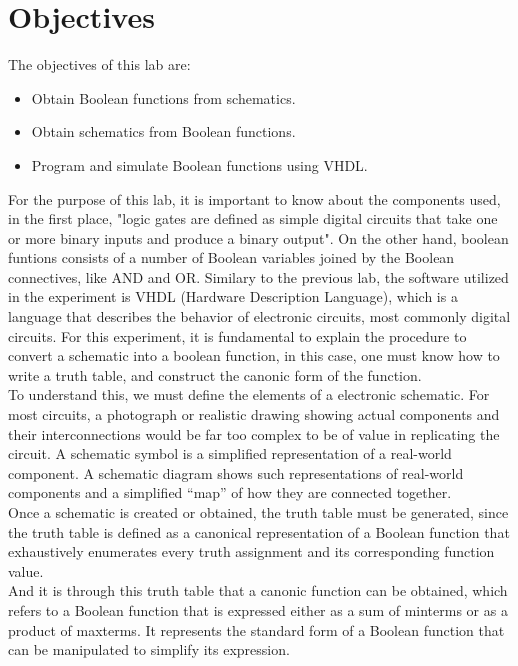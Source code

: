 \documentclass[12pt]{article}  %
\begin{document}
\section{Objectives} %
The objectives of this lab are:
\begin{itemize}
    \item Obtain Boolean functions from schematics.
    \item Obtain schematics from Boolean functions.
    \item Program and simulate Boolean functions using VHDL.
\end{itemize}
For the purpose of this lab, it is important to know about the components used, in the first place, "logic gates are defined as simple digital circuits that take one or more binary inputs and produce a binary output"\cite{HARRIS20221}.
On the other hand, boolean funtions consists of a number of Boolean variables joined by the Boolean connectives, like AND and OR. \cite{HOLDSWORTH200228}
Similary to the previous lab, the software utilized in the experiment is VHDL (Hardware Description Language), which is a language that describes the behavior of electronic circuits, most commonly digital circuits. \cite{IntelVHDLDef}
For this experiment, it is fundamental to explain the procedure to convert a schematic into a boolean function, in this case, one must know how to write a truth table, and construct the canonic form of the function.
\\To understand this, we must define the elements of a electronic schematic. For most circuits, a photograph or realistic drawing showing actual components and their interconnections would be far too complex to be of value in replicating the circuit. A schematic symbol is a simplified representation of a real-world component. A schematic diagram shows such representations of real-world components and a simplified “map” of how they are connected together.\cite{VARTERESIAN20021}
\\Once a schematic is created or obtained, the truth table must be generated, since the truth table is defined as a canonical representation of a Boolean function that exhaustively enumerates every truth assignment and its corresponding function value. \cite{JIANG2009299}
\\And it is through this truth table that a canonic function can be obtained, which refers to a Boolean function that is expressed either as a sum of minterms or as a product of maxterms. It represents the standard form of a Boolean function that can be manipulated to simplify its expression. \cite{HOLDSWORTH200243}
\end{document}
